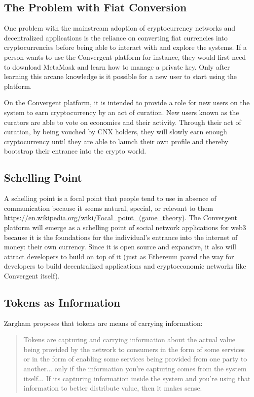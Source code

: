 \documentclass[a4paper, 10pt]{article}
\begin{document}
\subsection{The Problem with Fiat Conversion}

One problem with the mainstream adoption of cryptocurrency networks and decentralized applications is the reliance on converting fiat currencies into cryptocurrencies before being able to interact with and explore the systems. If a person wants to use the Convergent platform for instance, they would first need to download MetaMask and learn how to manage a private key. Only after learning this arcane knowledge is it possible for a new user to start using the platform. 

On the Convergent platform, it is intended to provide a role for new users on the system to earn cryptocurrency by an act of curation. New users known as the curators are able to vote on economies and their activity. Through their act of curation, by being vouched by CNX holders, they will slowly earn enough cryptocurrency until they are able to launch their own profile and thereby bootstrap their entrance into the crypto world.

\subsection{Schelling Point}

A schelling point is a focal point that people tend to use in absence of communication because it seems natural, special, or relevant to them \url{https://en.wikipedia.org/wiki/Focal_point_(game_theory)}. The Convergent platform will emerge as a schelling point of social network applications for web3 because it is the foundations for the individual’s entrance into the internet of money: their own currency. Since it is open source and expansive, it also will attract developers to build on top of it (just as Ethereum paved the way for developers to build decentralized applications and cryptoeconomic networks like Convergent itself).

\subsection{Tokens as Information}

Zargham proposes that tokens are means of carrying information:
\begin{quotation}
Tokens are capturing and carrying information about the actual value being provided by the network to consumers in the form of some services or in the form of enabling some services being provided from one party to another... only if the information you're capturing comes from the system itself... If its capturing information inside the system and you're using that information to better distribute value, then it makes sense.
\end{quotation}
\end{document}

